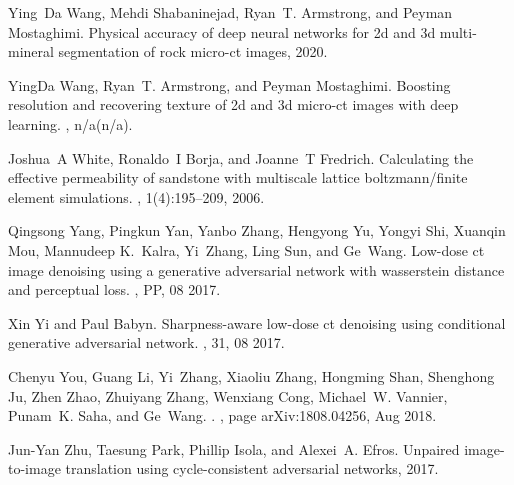 \documentclass{article}
\begin{document}
\begin{thebibliography}{10}
Ying~Da Wang, Mehdi Shabaninejad, Ryan~T. Armstrong, and Peyman Mostaghimi.
\newblock Physical accuracy of deep neural networks for 2d and 3d multi-mineral
  segmentation of rock micro-ct images, 2020.

YingDa Wang, Ryan~T. Armstrong, and Peyman Mostaghimi.
\newblock Boosting resolution and recovering texture of 2d and 3d micro-ct
  images with deep learning.
, n/a(n/a).

Joshua~A White, Ronaldo~I Borja, and Joanne~T Fredrich.
\newblock Calculating the effective permeability of sandstone with multiscale
  lattice boltzmann/finite element simulations.
, 1(4):195--209, 2006.

Qingsong Yang, Pingkun Yan, Yanbo Zhang, Hengyong Yu, Yongyi Shi, Xuanqin Mou,
  Mannudeep K.~Kalra, Yi~Zhang, Ling Sun, and Ge~Wang.
\newblock Low-dose ct image denoising using a generative adversarial network
  with wasserstein distance and perceptual loss.
, PP, 08 2017.

Xin Yi and Paul Babyn.
\newblock Sharpness-aware low-dose ct denoising using conditional generative
  adversarial network.
, 31, 08 2017.

Chenyu {You}, Guang {Li}, Yi~{Zhang}, Xiaoliu {Zhang}, Hongming {Shan},
  Shenghong {Ju}, Zhen {Zhao}, Zhuiyang {Zhang}, Wenxiang {Cong}, Michael~W.
  {Vannier}, Punam~K. {Saha}, and Ge~{Wang}.
.
, page arXiv:1808.04256, Aug 2018.

Jun-Yan Zhu, Taesung Park, Phillip Isola, and Alexei~A. Efros.
\newblock Unpaired image-to-image translation using cycle-consistent
  adversarial networks, 2017.

\end{thebibliography}
\end{document}
